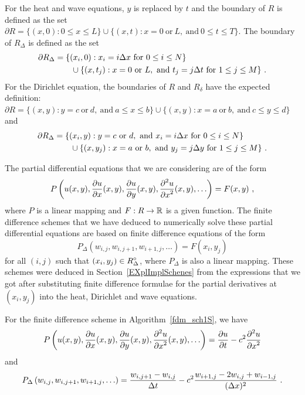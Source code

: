 \begin{egg}
For the heat and wave equations, $y$ is replaced by $t$ and the
boundary of $R$ is defined as the set
$\partial R  = \{ (x,0) : 0 \leq x \leq L \} \cup
\{ (x,t) : x = 0 \ \text{or} \ L, \ \text{and} \ 0 \leq t \leq T \}$.
The boundary of $R_\Delta$ is defined as the set
\begin{align*}
\partial R_\Delta
&= \{ (x_i,0) : x_i = i \Delta{x} \ \text{for} \ 0 \leq i \leq N \} \\
& \qquad \cup 
\{ (x,t_j) : x = 0 \ \text{or} \ L ,\ \text{and} \ t_j = j \Delta{t}
\ \text{for} \ 1 \leq j \leq M \} \ .
\end{align*}
For the Dirichlet equation, the boundaries of $R$ and
$R_\delta$ have the expected definition:
$\partial R  = \{ (x,y) : y = c \ \text{or} \ d ,\ \text{and}
\ a \leq x \leq b \} \cup
\{ (x,y) : x = a \ \text{or} \ b ,\ \text{and} \ c \leq y \leq d \}$
and
\begin{align*}
\partial
R_\Delta &= \{ (x_i,y) : y = c \ \text{or} \ d ,\ \text{and}
\ x_i = i \Delta{x} \ \text{for} \ 0 \leq i \leq N \} \\
&\qquad \cup 
\{ (x,y_j) : x = a \ \text{or} \ b ,\ \text{and} \ y_j = j \Delta{y}
\ \text{for} \ 1 \leq j \leq M \} \ .
\end{align*}
\end{egg}

The partial differential equations that we are considering are of the form 
\begin{equation} \label{fdm_pde_tr}
P\left(u(x,y), \frac{\partial{u}}{\partial{x}}(x,y), \frac{\partial{u}}{\partial{y}}(x,y),
\frac{\displaystyle \partial^{2}{u}} {\displaystyle \partial{x}^{2}}(x,y), \ldots \right)= F(x,y) \ ,
\end{equation}
where $P$ is a linear mapping and $F:R\to \mathbb{R}$ is a given function.
The finite difference schemes that we have deduced to numerically
solve these partial differential equations are based
on finite difference equations of the form
\begin{equation} \label{fdm_fde_tr}
P_\Delta\left(w_{i,j}, w_{i,j+1}, w_{i+1,j}, \ldots\right)
= F(x_i,y_j)
\end{equation}
for all $(i,j)$ such that $\displaystyle (x_i,y_j) \in R^\circ_\Delta$, where
$P_\Delta$ is also a linear mapping.  These schemes were deduced
in Section~\ref{EXplImplSchenes} from the expressions that we got
after substituting finite difference formulae for the partial
derivatives at $(x_i,y_j)$ into the heat, Dirichlet and wave equations.

\begin{egg}
For the finite difference scheme in Algorithm~\ref{fdm_sch1S}, we have
\[
P\left(u(x,y), \frac{\partial{u}}{\partial{x}}(x,y), \frac{\partial{u}}{\partial{y}}(x,y),
\frac{\displaystyle \partial^{2}{u}} {\displaystyle \partial{x}^{2}}(x,y), \ldots \right)
= \frac{\partial{u}}{\partial{t}} - c^2 \frac{\displaystyle \partial^{2}{u}} {\displaystyle \partial{x}^{2}}
\]
and
\begin{equation}\label{fdm_PDelta_egg}
  P_\Delta\left(w_{i,j}, w_{i,j+1}, w_{i+1,j}, \ldots\right)
= \frac{w_{i,j+1} - w_{i,j}}{\Delta{t}} - c^2 \frac{w_{i+1,j} - 2w_{i,j} +
w_{i-1,j}}{(\Delta{x})^2} \ .
\end{equation}
\end{egg}

